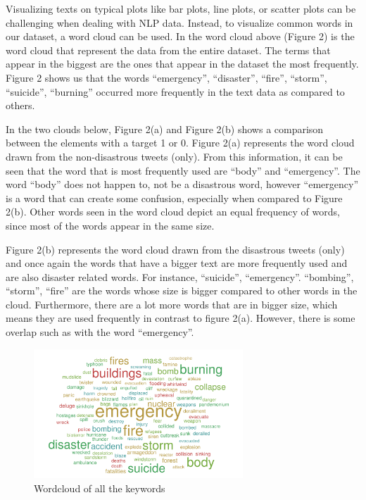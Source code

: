 \documentclass{article}
\begin{document}
Visualizing texts on typical plots like bar plots, line plots, or scatter plots can be challenging when dealing with NLP data. Instead, to visualize common words in our dataset, a word cloud can be used. In the word cloud above (Figure 2) is the word cloud that represent the data from the entire dataset. The terms that appear in the biggest are the ones that appear in the dataset the most frequently. Figure 2 shows us that the words ``emergency”, ``disaster”, ``fire”, ``storm”, ``suicide”, ``burning” occurred more frequently in the text data as compared to others. 

In the two clouds below, Figure 2(a) and  Figure 2(b) shows a comparison between the elements with a target 1 or 0. Figure 2(a) represents the word cloud drawn from the non-disastrous tweets (only). From this information, it can be seen that the word that is most frequently used are ``body” and ``emergency”. The word ``body” does not happen to, not be a disastrous word, however ``emergency” is a word that can create some confusion, especially when compared to Figure 2(b). Other words seen in the word cloud depict an equal frequency of words, since most of the words appear in the same size.

Figure 2(b) represents the word cloud drawn from the disastrous tweets (only) and once again the words that have a bigger text are more frequently used and are also disaster related words. For instance, ``suicide”, ``emergency”. ``bombing”, ``storm”, “fire” are the words whose size is bigger compared to other words in the cloud. Furthermore, there are a lot more words that are in bigger size, which means they are used frequently in contrast to figure 2(a). However, there is some overlap such as with the word ``emergency”. 

\begin{figure}[!h]
    \centering
    \includegraphics[width=0.7\textwidth, left]{wordcloud.png}
    \caption{Wordcloud of all the keywords}
    \label{fig:wordcloud}
\end{figure}
\end{document}
